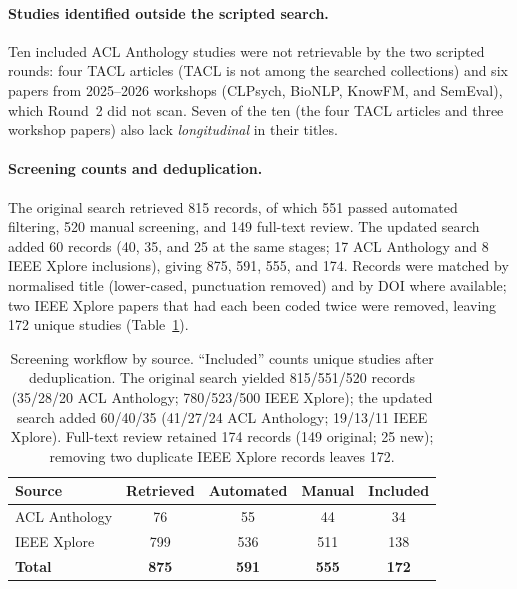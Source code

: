 \documentclass[11pt]{article}
\theoremstyle{plain}
\theoremstyle{definition}
\theoremstyle{remark}
\begin{document}
\paragraph{Studies identified outside the scripted search.} Ten included ACL Anthology studies were not retrievable by the two scripted rounds: four TACL articles (TACL is not among the searched collections) and six papers from 2025--2026 workshops (CLPsych, BioNLP, KnowFM, and SemEval), which Round~2 did not scan. Seven of the ten (the four TACL articles and three workshop papers) also lack \emph{longitudinal} in their titles.

\paragraph{Screening counts and deduplication.} The original search retrieved 815 records, of which 551 passed automated filtering, 520 manual screening, and 149 full-text review. The updated search added 60 records (40, 35, and 25 at the same stages; 17 ACL Anthology and 8 IEEE Xplore inclusions), giving 875, 591, 555, and 174. Records were matched by normalised title (lower-cased, punctuation removed) and by DOI where available; two IEEE Xplore papers that had each been coded twice were removed, leaving 172 unique studies (Table~\ref{tab:screening_counts_small}).

\begin{table}[!t]
\centering
\footnotesize
\setlength{\tabcolsep}{2pt}
\renewcommand{\arraystretch}{0.95}
\begin{tabular*}{\columnwidth}{@{\extracolsep{\fill}}lcccc@{}}
\toprule
\rowcolor{gray!18}
\textbf{Source} &
\textbf{Retrieved} &
\textbf{Automated} &
\textbf{Manual} &
\textbf{Included} \\
\midrule
ACL Anthology & 76  & 55  & 44  & 34  \\
IEEE Xplore   & 799 & 536 & 511 & 138 \\
\midrule
\textbf{Total} &
\textbf{875} &
\textbf{591} &
\textbf{555} &
\textbf{172} \\
\bottomrule
\end{tabular*}
\caption{Screening workflow by source. ``Included'' counts
unique studies after deduplication. The original search yielded
815/551/520 records (35/28/20 ACL Anthology; 780/523/500 IEEE
Xplore); the updated search added 60/40/35 (41/27/24 ACL
Anthology; 19/13/11 IEEE Xplore). Full-text review retained
174 records (149 original; 25 new); removing two duplicate
IEEE Xplore records leaves 172.}
\label{tab:screening_counts_small}
\end{table}
\end{document}
